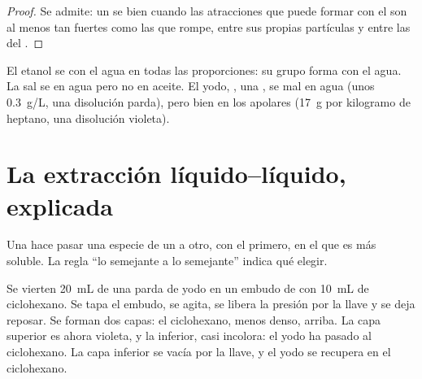 \begin{proof}
Se admite: un  se  bien cuando las atracciones que puede
formar con el  son al menos tan fuertes como las que rompe,
entre sus propias partículas y entre las  del .
\end{proof}

\begin{example}\label{ex:g11:dissolution:cases}
El etanol se  con el agua en todas las proporciones: su grupo
 forma  con el agua. La sal se  en
agua pero no en aceite. El yodo, , una , se
 mal en agua (unos \qty{0.3}{g/L}, una disolución parda), pero
bien en los  apolares (\qty{17}{g} por kilogramo de heptano,
una disolución violeta).
\end{example}

\section{La extracción líquido--líquido, explicada}

Una  hace pasar una especie de un 
a otro,  con el primero, en el que es más soluble. La regla
``lo semejante  a lo semejante'' indica qué  elegir.

\begin{inthelab}
Se vierten \qty{20}{mL} de una  parda de yodo en un
embudo de  con \qty{10}{mL} de ciclohexano. Se tapa el
embudo, se agita, se libera la presión por la llave y se deja reposar.
Se forman dos capas: el ciclohexano, menos denso, arriba. La capa
superior es ahora violeta, y la inferior, casi incolora: el yodo ha
pasado al ciclohexano. La capa inferior se vacía por la llave, y el
yodo se recupera en el ciclohexano.
\end{inthelab}

